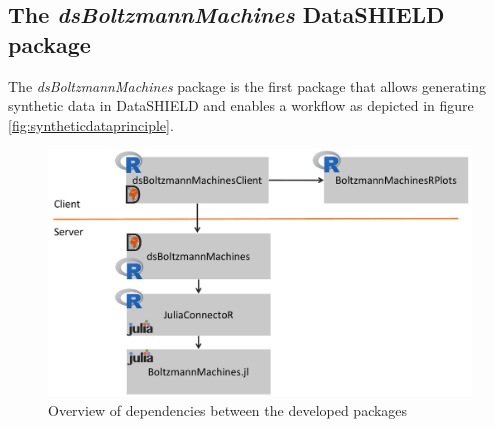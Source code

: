 \documentclass[12pt]{article}
\newcommand{\apkg}[1]{\emph{#1}}
\begin{document}
\subsection{The \apkg{dsBoltzmannMachines} DataSHIELD package}

The \apkg{dsBoltzmannMachines} package is the first package that allows generating synthetic data in DataSHIELD and enables a workflow as depicted in figure \ref{fig:syntheticdataprinciple}.



\begin{figure}[h]
   \centering
   \includegraphics[scale=0.5]{images/dsBoltzmannMachinesOverview.pdf}
   \caption{Overview of dependencies between the developed packages}
 \end{figure}
 
 

\end{document}

